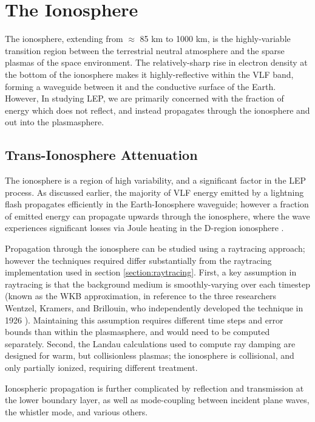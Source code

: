 \section{The Ionosphere}
The ionosphere, extending from $\approx$ 85 km to 1000 km, is the highly-variable transition region between the terrestrial neutral atmosphere and the sparse plasmas of the space environment. The relatively-sharp rise in electron density at the bottom of the ionosphere makes it highly-reflective within the VLF band, forming a waveguide between it and the conductive surface of the Earth. However, In studying LEP, we are primarily concerned with the fraction of energy which does not reflect, and instead propagates through the ionosphere and out into the plasmasphere.

\subsection{Trans-Ionosphere Attenuation}
\label{section:trans_ionosphere_atten}
The ionosphere is a region of high variability, and a significant factor in the LEP process. As discussed earlier, the majority of VLF energy emitted by a lightning flash propagates efficiently in the Earth-Ionosphere waveguide; however a fraction of emitted energy can propagate upwards through the ionosphere, where the wave experiences significant losses via Joule heating in the D-region ionosphere \citep{Graf2013, Marshall2014, Blaes2016}.

Propagation through the ionosphere can be studied using a raytracing approach; however the techniques required differ substantially from the raytracing implementation used in section \ref{section:raytracing}. First, a key assumption in raytracing is that the background medium is smoothly-varying over each timestep (known as the WKB approximation, in reference to the three researchers Wentzel, Kramers, and Brillouin, who independently developed the technique in 1926 \citep{Bender1999}). Maintaining this assumption requires different time steps and error bounds than within the plasmasphere, and would need to be computed separately. Second, the Landau calculations used to compute ray damping are designed for warm, but collisionless plasmas; the ionosphere is collisional, and only partially ionized, requiring different treatment.

Ionospheric propagation is further complicated by reflection and transmission at the lower boundary layer, as well as mode-coupling between incident plane waves, the whistler mode, and various others. 

